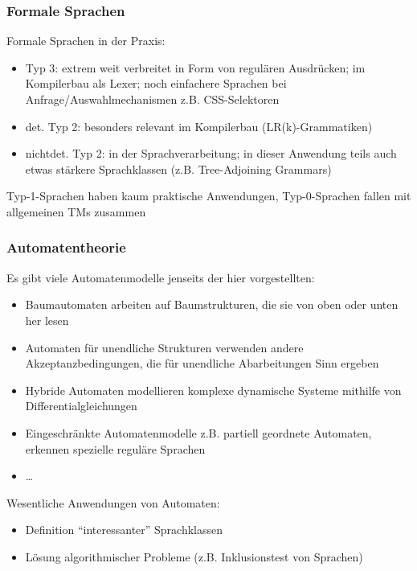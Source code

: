 \documentclass[aspectratio=1610,onlymath]{beamer}
\begin{document}
\begin{frame}\frametitle{Formale Sprachen}

Formale Sprachen in der Praxis:
\begin{itemize}
\item Typ 3: extrem weit verbreitet in Form von regulären Ausdrücken; im \alert{Kompilerbau} als Lexer; noch einfachere Sprachen bei Anfrage/Auswahlmechanismen z.B. CSS-Selektoren
\item det. Typ 2: besonders relevant im \alert{Kompilerbau} (LR(k)-Grammatiken)
\item nichtdet. Typ 2: in der \alert{Sprachverarbeitung}; in dieser Anwendung teils auch etwas stärkere Sprachklassen (z.B. Tree-Adjoining Grammars)
\end{itemize}
Typ-1-Sprachen haben kaum praktische Anwendungen, Typ-0-Sprachen fallen mit allgemeinen TMs zusammen

\end{frame}


\begin{frame}\frametitle{Automatentheorie}

Es gibt viele Automatenmodelle jenseits der hier vorgestellten:
\begin{itemize}
\item \alert{Baumautomaten} arbeiten auf Baumstrukturen, die sie von oben oder unten her lesen
\item \alert{Automaten für unendliche Strukturen} verwenden andere Akzeptanzbedingungen, die für unendliche Abarbeitungen Sinn ergeben
\item \alert{Hybride Automaten} modellieren komplexe dynamische Systeme mithilfe von Differentialgleichungen
\item \alert{Eingeschränkte Automatenmodelle} z.B. partiell geordnete Automaten, erkennen spezielle reguläre Sprachen
\item \ldots
\end{itemize}
Wesentliche Anwendungen von Automaten:
\begin{itemize}
\item Definition "`interessanter"' Sprachklassen
\item Lösung algorithmischer Probleme (z.B. Inklusionstest von Sprachen)
\end{itemize}

\end{frame}
\end{document}
